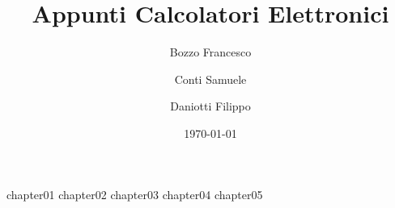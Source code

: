 \documentclass[a4paper,12pt]{book}
\begin{document}
	\author{Bozzo Francesco \and Conti Samuele \and Daniotti Filippo}
	\title{Appunti Calcolatori Elettronici}
	\date{\today}

	\frontmatter
	\maketitle
	\tableofcontents

	\mainmatter

	{chapter01}
	{chapter02}
	{chapter03}
	{chapter04}
	{chapter05}

	\backmatter
\end{document}
